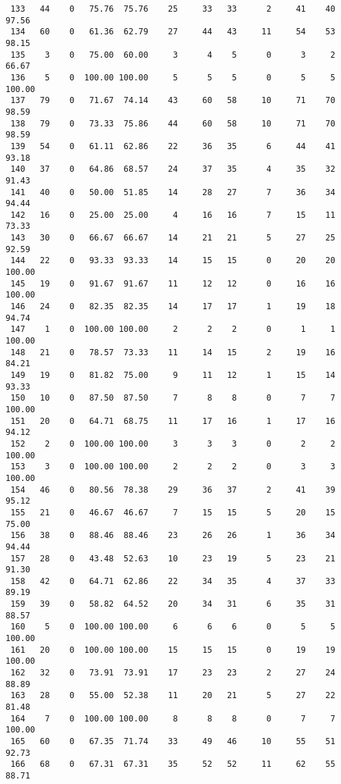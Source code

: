 \begin{verbatim}
 133   44    0   75.76  75.76    25     33   33      2     41    40    97.56
 134   60    0   61.36  62.79    27     44   43     11     54    53    98.15
 135    3    0   75.00  60.00     3      4    5      0      3     2    66.67
 136    5    0  100.00 100.00     5      5    5      0      5     5   100.00
 137   79    0   71.67  74.14    43     60   58     10     71    70    98.59
 138   79    0   73.33  75.86    44     60   58     10     71    70    98.59
 139   54    0   61.11  62.86    22     36   35      6     44    41    93.18
 140   37    0   64.86  68.57    24     37   35      4     35    32    91.43
 141   40    0   50.00  51.85    14     28   27      7     36    34    94.44
 142   16    0   25.00  25.00     4     16   16      7     15    11    73.33
 143   30    0   66.67  66.67    14     21   21      5     27    25    92.59
 144   22    0   93.33  93.33    14     15   15      0     20    20   100.00
 145   19    0   91.67  91.67    11     12   12      0     16    16   100.00
 146   24    0   82.35  82.35    14     17   17      1     19    18    94.74
 147    1    0  100.00 100.00     2      2    2      0      1     1   100.00
 148   21    0   78.57  73.33    11     14   15      2     19    16    84.21
 149   19    0   81.82  75.00     9     11   12      1     15    14    93.33
 150   10    0   87.50  87.50     7      8    8      0      7     7   100.00
 151   20    0   64.71  68.75    11     17   16      1     17    16    94.12
 152    2    0  100.00 100.00     3      3    3      0      2     2   100.00
 153    3    0  100.00 100.00     2      2    2      0      3     3   100.00
 154   46    0   80.56  78.38    29     36   37      2     41    39    95.12
 155   21    0   46.67  46.67     7     15   15      5     20    15    75.00
 156   38    0   88.46  88.46    23     26   26      1     36    34    94.44
 157   28    0   43.48  52.63    10     23   19      5     23    21    91.30
 158   42    0   64.71  62.86    22     34   35      4     37    33    89.19
 159   39    0   58.82  64.52    20     34   31      6     35    31    88.57
 160    5    0  100.00 100.00     6      6    6      0      5     5   100.00
 161   20    0  100.00 100.00    15     15   15      0     19    19   100.00
 162   32    0   73.91  73.91    17     23   23      2     27    24    88.89
 163   28    0   55.00  52.38    11     20   21      5     27    22    81.48
 164    7    0  100.00 100.00     8      8    8      0      7     7   100.00
 165   60    0   67.35  71.74    33     49   46     10     55    51    92.73
 166   68    0   67.31  67.31    35     52   52     11     62    55    88.71

\end{verbatim}
